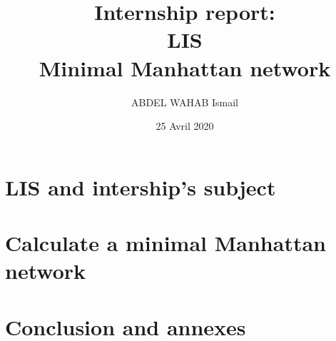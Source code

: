 \documentclass[11pt]{report}
\title{\textbf{Internship report: \\
			LIS\\  Minimal Manhattan network}}
\author{ABDEL WAHAB Ismail}
\date{25 Avril 2020}
\begin{document}
\maketitle
\thispagestyle{empty}
\renewcommand{\contentsname}{Summary}
\tableofcontents
\newpage

\iffalse --------------  Document Content-------------------------- \fi

\part{LIS and intership's subject}


\part{Calculate a minimal Manhattan network}






\part{Conclusion and annexes}



\end{document}
